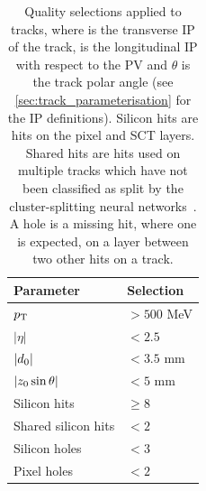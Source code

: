\begin{table}[!htbp]
  \footnotesize\centering
  \setlength{\tabcolsep}{0.5em} %
  \begin{tabular}{ll}
    \toprule\hline
    \textbf{Parameter} & \textbf{Selection} \\
    \hline
    $p_{\text{T}}$                & $> 500$ MeV \\
    $|\eta|$             & $<2.5$ \\
    $|d_{0}|$           & $< 3.5$ mm \\
    $|z_{0}\sin\theta|$ & $< 5$ mm \\
    Silicon hits         & $\ge 8$ \\
    Shared silicon hits  & $< 2$ \\
    Silicon holes        & $< 3$ \\
    Pixel holes          & $< 2$ \\
    \hline\bottomrule
  \end{tabular}
  \caption{
    Quality selections applied to tracks,
    where \dzero is the transverse IP of the track, \zzero is the longitudinal IP with respect to the PV and $\theta$ is the track polar angle (see \cref{sec:track_parameterisation} for the IP definitions).
    Silicon hits are hits on the pixel and SCT layers.
    Shared hits are hits used on multiple tracks which have not been classified as split by the cluster-splitting neural networks~\cite{PERF-2015-08}.
    A hole is a missing hit, where one is expected, on a layer between two other hits on a track.
    }%
  \vspace{4mm}
  \label{tab:fake_track_mva_selections}
\end{table}


